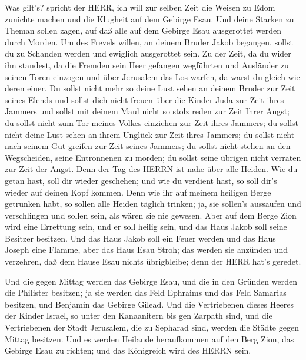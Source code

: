  Was gilt's? spricht der HERR, ich will zur selben Zeit die
Weisen zu Edom zunichte machen und die Klugheit auf dem Gebirge Esau.
 Und deine Starken zu Theman sollen zagen, auf daß alle auf
dem Gebirge Esau ausgerottet werden durch Morden.  Um des
Frevels willen, an deinem Bruder Jakob begangen, sollst du zu Schanden
werden und ewiglich ausgerottet sein.  Zu der Zeit, da du
wider ihn standest, da die Fremden sein Heer gefangen wegführten und
Ausländer zu seinen Toren einzogen und über Jerusalem das Los warfen, da
warst du gleich wie deren einer.  Du sollst nicht mehr so
deine Lust sehen an deinem Bruder zur Zeit seines Elends und sollst dich
nicht freuen über die Kinder Juda zur Zeit ihres Jammers und sollst mit
deinem Maul nicht so stolz reden zur Zeit Ihrer Angst;  du
sollst nicht zum Tor meines Volkes einziehen zur Zeit ihres Jammers; du
sollst nicht deine Lust sehen an ihrem Unglück zur Zeit ihres Jammers;
du sollst nicht nach seinem Gut greifen zur Zeit seines Jammers;
 du sollst nicht stehen an den Wegscheiden, seine
Entronnenen zu morden; du sollst seine übrigen nicht verraten zur Zeit
der Angst.  Denn der Tag des HERRN ist nahe über alle
Heiden. Wie du getan hast, soll dir wieder geschehen; und wie du
verdient hast, so soll dir's wieder auf deinen Kopf kommen.
 Denn wie ihr auf meinem heiligen Berge getrunken habt, so
sollen alle Heiden täglich trinken; ja, sie sollen's aussaufen und
verschlingen und sollen sein, als wären sie nie gewesen. 
Aber auf dem Berge Zion wird eine Errettung sein, und er soll heilig
sein, und das Haus Jakob soll seine Besitzer besitzen.  Und
das Haus Jakob soll ein Feuer werden und das Haus Joseph eine Flamme,
aber das Haus Esau Stroh; das werden sie anzünden und verzehren, daß dem
Hause Esau nichts übrigbleibe; denn der HERR hat's geredet.

 Und die gegen Mittag werden das Gebirge Esau, und die in
den Gründen werden die Philister besitzen; ja sie werden das Feld
Ephraims und das Feld Samarias besitzen, und Benjamin das Gebirge
Gilead.  Und die Vertriebenen dieses Heeres der Kinder
Israel, so unter den Kanaanitern bis gen Zarpath sind, und die
Vertriebenen der Stadt Jerusalem, die zu Sepharad sind, werden die
Städte gegen Mittag besitzen.  Und es werden Heilande
heraufkommen auf den Berg Zion, das Gebirge Esau zu richten; und das
Königreich wird des HERRN sein.
